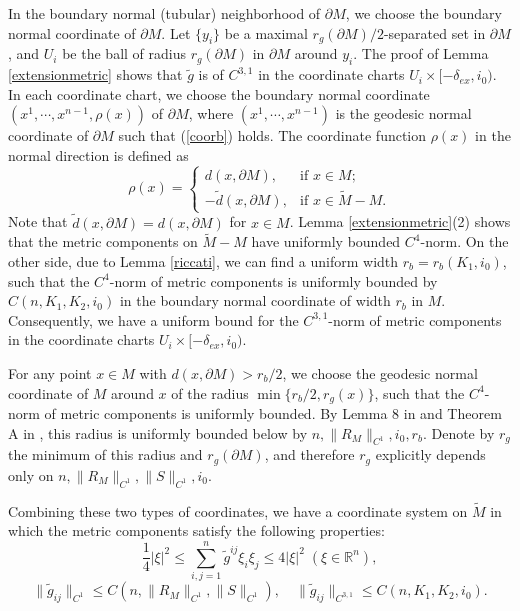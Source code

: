 \documentclass[11pt,letterpaper]{amsart}
\numberwithin{equation}{section}
\theoremstyle{definition}
\theoremstyle{plain}
\theoremstyle{definition}
\theoremstyle{plain}
\theoremstyle{definition}
\theoremstyle{plain}
\begin{document}
In the boundary normal (tubular) neighborhood of $\partial M$, we choose the boundary normal coordinate of $\partial M$. Let $\{y_i\}$ be a maximal $r_g(\partial M)/2$-separated set in $\partial M$, and $U_i$ be the ball of radius $r_g(\partial M)$ in $\partial M$ around $y_i$. The proof of Lemma \ref{extensionmetric} shows that $\widetilde{g}$ is of $C^{3,1}$ in the coordinate charts $U_i\times [-\delta_{ex},i_0)$. In each coordinate chart, we choose the boundary normal coordinate $(x^1,\cdots,x^{n-1},\rho(x))$ of $\partial M$, where $(x^1,\cdots,x^{n-1})$ is the geodesic normal coordinate of $\partial M$ such that (\ref{coorb}) holds. The coordinate function $\rho(x)$ in the normal direction is defined as
\begin{equation}\label{def-rhox}
\rho(x) = \left\{ \begin{array}{ll}
         d(x,\partial M), & \mbox{if $x\in M$}; \\
         -\widetilde{d}(x,\partial M), & \mbox{if $x\in \widetilde{M}-M$}.\end{array} \right. 
\end{equation}
Note that $\widetilde{d}(x,\partial M)=d(x,\partial M)$ for $x\in M$. Lemma \ref{extensionmetric}(2) shows that the metric components on $\widetilde{M}-M$ have uniformly bounded $C^4$-norm. On the other side, due to Lemma \ref{riccati}, we can find a uniform width $r_b=r_b(K_1,i_0)$, such that the $C^4$-norm of metric components is uniformly bounded by $C(n,K_1,K_2,i_0)$ in the boundary normal coordinate of width $r_b$ in $M$. Consequently, we have a uniform bound for the $C^{3,1}$-norm of metric components in the coordinate charts $U_i\times [-\delta_{ex},i_0)$.

For any point $x\in M$ with $d(x,\partial M)> r_b/2$, we choose the geodesic normal coordinate of $M$ around $x$ of the radius $ \min\{r_b/2,r_g(x)\}$, such that the $C^4$-norm of metric components is uniformly bounded. By Lemma 8 in \cite{HV} and Theorem A in \cite{E}, this radius is uniformly bounded below by $n,\|R_M\|_{C^1},i_0,r_b$. Denote by $r_g$ the minimum of this radius and $r_g(\partial M)$, and therefore $r_g$ explicitly depends only on $n,\|R_M\|_{C^1},\|S\|_{C^1},i_0$. 

Combining these two types of coordinates, we have a coordinate system on $\widetilde{M}$ in which the metric components satisfy the following properties:
$$\frac{1}{4}|\xi|^2\leqslant \sum_{i,j=1}^{n} \widetilde{g}^{ij}\xi_{i}\xi_{j} \leqslant 4|\xi|^2\; (\xi\in\mathbb{R}^n),$$
\begin{equation}\label{metricboundex}
\|\widetilde{g}_{ij}\|_{C^{1}}\leqslant C(n,\|R_{M}\|_{C^1},\|S\|_{C^1}),\quad \|\widetilde{g}_{ij}\|_{C^{3,1}}\leqslant C(n,K_1,K_2,i_0).
\end{equation}
\end{document}
